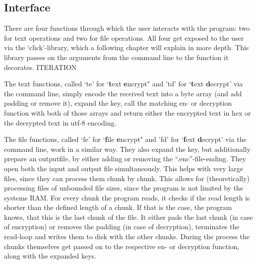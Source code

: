 \hypertarget{interface}{%
\subsection{Interface}\label{interface}}

There are four functions through which the user interacts with the
program: two for text operations and two for file operations. All four
get exposed to the user via the `click'-library, which a following
chapter will explain in more depth. This library passes on the arguments
from the command line to the function it decorates. ITERATION

The text functions, called `te' for `\textbf{t}ext \textbf{e}ncrypt" and
'td' for `\textbf{t}ext \textbf{d}ecrypt' via the command line, simply
encode the received text into a byte array (and add padding or remove
it), expand the key, call the matching en- or decryption function with
both of those arrays and return either the encrypted text in hex or the
decrypted text in utf-8 encoding.

The file functions, called `fe' for `\textbf{f}ile \textbf{e}ncrypt" and
'fd' for `\textbf{f}ext \textbf{d}ecrypt' via the command line, work in
a similar way. They also expand the key, but additionally prepare an
outputfile, by either adding or removing the ``.enc''-file-ending. They
open both the input and output file simultaneously. This helps with very
large files, since they can process them chunk by chunk. This allows for
(theoretically) processing files of unbounded file sizes, since the
program is not limited by the systems RAM. For every chunk the program
reads, it checks if the read length is shorter than the defined length
of a chunk. If that is the case, the program knows, that this is the
last chunk of the file. It either pads the last chunk (in case of
encryption) or removes the padding (in case of decryption), terminates
the read-loop and writes them to disk with the other chunks. During the
process the chunks themselves get passed on to the respective en- or
decryption function, along with the expanded keys.
